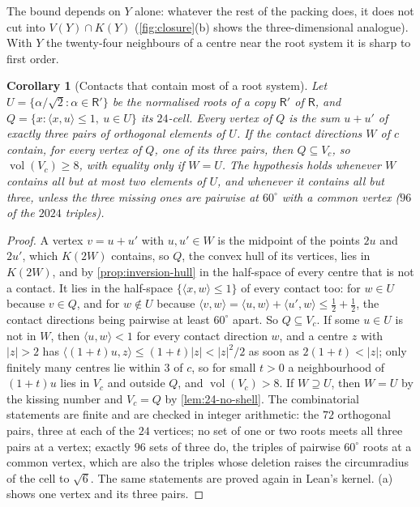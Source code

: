 \documentclass[11pt,reqno]{amsart}
\renewcommand{\_}{\origunderscore\allowbreak}
\numberwithin{equation}{section}
\theoremstyle{plain}
\newtheorem{cor}[thm]{Corollary}
\theoremstyle{definition}
\theoremstyle{remark}
\newcommand{\Rt}{\mathsf{R}}                 %
\DeclareMathOperator{\vol}{vol}
\begin{document}
The bound depends on $Y$ alone: whatever the rest of the packing does,
it does not cut into $V(Y)\cap K(Y)$ (\cref{fig:closure}(b) shows the
three-dimensional analogue). With $Y$ the twenty-four
neighbours of a centre near the root system it is sharp to first order.

\begin{cor}[Contacts that contain most of a root system]\label{cor:root-subsets}
Let $U=\{\alpha/\sqrt2:\alpha\in\Rt'\}$ be the normalised roots of a
copy $\Rt'$ of $\Rt$, and $Q=\{x:\langle x,u\rangle\le1,\ u\in U\}$ its
$24$-cell. Every vertex of $Q$ is the sum $u+u'$ of exactly three pairs
of orthogonal elements of $U$. If the contact directions $W$ of $c$
contain, for every vertex of $Q$, one of its three pairs, then
$Q\subseteq V_c$, so $\vol(V_c)\ge8$, with equality only if $W=U$. The
hypothesis holds whenever $W$ contains all but at most two elements of
$U$, and whenever it contains all but three, unless the three missing
ones are pairwise at $60^\circ$ with a common vertex ($96$ of the $2024$
triples).
\end{cor}

\begin{proof}
A vertex $v=u+u'$ with $u,u'\in W$ is the midpoint of the points $2u$ and
$2u'$, which $K(2W)$ contains, so $Q$, the convex hull of its vertices,
lies in $K(2W)$, and by \cref{prop:inversion-hull} in the half-space of
every centre that is not a contact. It lies in the half-space
$\{\langle x,w\rangle\le1\}$ of every contact too: for $w\in U$ because
$v\in Q$, and for $w\notin U$ because
$\langle v,w\rangle=\langle u,w\rangle+\langle u',w\rangle\le\frac12+\frac12$,
the contact directions being pairwise at least $60^\circ$ apart. So
$Q\subseteq V_c$. If some $u\in U$ is not in $W$, then
$\langle u,w\rangle<1$ for every contact direction $w$, and a centre $z$
with $|z|>2$ has $\langle(1+t)u,z\rangle\le(1+t)|z|<|z|^2/2$ as soon as
$2(1+t)<|z|$; only finitely many centres lie within $3$ of $c$, so for
small $t>0$ a neighbourhood of $(1+t)u$ lies in $V_c$ and outside $Q$,
and $\vol(V_c)>8$. If $W\supseteq U$, then $W=U$ by the kissing
number and $V_c=Q$ by \cref{lem:24-no-shell}. The combinatorial
statements are finite and are checked in integer arithmetic: the $72$ orthogonal pairs, three at each of
the $24$ vertices; no set of one or two roots meets all three pairs at a
vertex; exactly $96$ sets of three do, the triples of pairwise
$60^\circ$ roots at a common vertex, which are also the triples whose
deletion raises the circumradius of the cell to $\sqrt6$.
The same statements are proved again in Lean's kernel. (a) shows one vertex and
its three pairs.
\end{proof}
\end{document}
